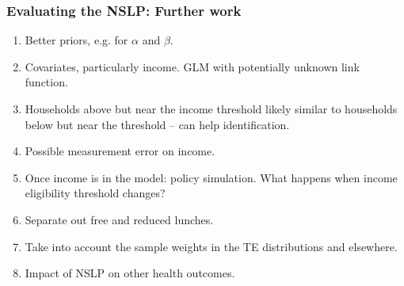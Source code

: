 \documentclass[xcolor=dvipsnames]{beamer}
\begin{document}
\begin{frame}[fragile]
\frametitle{Evaluating the NSLP: Further work}
  \begin{enumerate}
\item Better priors, e.g. for $\alpha$ and $\beta$.
\item Covariates, particularly income. GLM with potentially unknown link function.
\item Households above but near the income threshold likely similar to households below but near the threshold -- can help identification.
\item Possible measurement error on income.
\item Once income is in the model: policy simulation. What happens when income eligibility threshold changes?
\item Separate out free and reduced lunches.
\item Take into account the sample weights in the TE distributions and elsewhere.
\item Impact of NSLP on other health outcomes.\\~\\
  \end{enumerate}
  
\end{frame}





\end{document}
